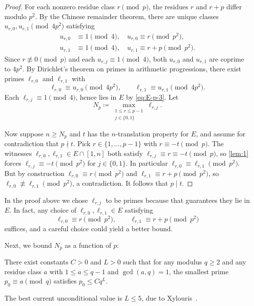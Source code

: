 \documentclass{amsart}
\begin{document}
\begin{proof}
    For each nonzero residue class $r \pmod p$, the residues $r$ and $r + p$ differ modulo $p^2$. By the Chinese remainder theorem, there are unique classes $u_{r,0}, u_{r,1} \pmod{4p^2}$ satisfying
\begin{align*}
u_{r,0}&\equiv 1\pmod 4,\quad u_{r,0}\equiv r\pmod{p^2},\\
u_{r,1}&\equiv 1\pmod 4,\quad u_{r,1}\equiv r+p\pmod{p^2}.
\end{align*}
    Since $r \not\equiv 0 \pmod p$ and each $u_{r,j} \equiv 1 \pmod 4$, both $u_{r,0}$ and $u_{r,1}$ are coprime to $4p^2$.
    By Dirichlet's theorem on primes in arithmetic progressions,
    there exist primes $\ell_{r,0}$ and $\ell_{r,1}$ with
\[
\ell_{r,0}\equiv u_{r,0}\pmod{4p^2}, \qquad \ell_{r,1}\equiv u_{r,1}\pmod{4p^2}.
\]
Each $\ell_{r,j} \equiv 1 \pmod 4$, hence lies in $E$ by \eqref{eq:E-p-3}. Let
\begin{equation*}
    N_p \coloneqq \max_{\substack{1 \leq r \leq p-1 \\ j \in \{0,1\}}} \ell_{r,j}.
\end{equation*}

Now suppose $n \geq N_p$ and $t$ has the $n$-translation property for $E$, and assume for contradiction that $p \nmid t$. Pick $r \in \{1, \dots, p-1\}$ with $r \equiv -t \pmod p$. The witnesses $\ell_{r,0}, \ell_{r,1} \in E \cap [1,n]$ both satisfy $\ell_{r,j} \equiv r \equiv -t \pmod p$, so \cref{lem:1} forces $\ell_{r,j} \equiv -t \pmod{p^2}$ for $j \in \{0,1\}$. In particular $\ell_{r,0} \equiv \ell_{r,1} \pmod{p^2}$. But by construction $\ell_{r,0} \equiv r \pmod{p^2}$ and $\ell_{r,1} \equiv r + p \pmod{p^2}$, so $\ell_{r,0} \not\equiv \ell_{r,1} \pmod{p^2}$, a contradiction. It follows that $p \mid t$.
\end{proof}

\begin{remark}
    In the proof above we chose $\ell_{r,j}$ to be primes because that guarantees they lie in $E$. In fact, any choice of $\ell_{r,0}, \ell_{r,1} \in E$ satisfying
    \begin{equation*}
        \ell_{r,0} \equiv r \pmod{p^2}, \qquad \ell_{r,1} \equiv r + p \pmod{p^2}
    \end{equation*}
    suffices, and a careful choice could yield a better bound.
\end{remark}

Next, we bound $N_p$ as a function of $p$:
\begin{theorem}\label{thm:A}
   There exist constants $C > 0$ and $L > 0$ such that for any modulus $q \geq 2$ and any residue class $a$ with $1 \leq a \leq q-1$ and $\gcd(a,q) = 1$, the smallest prime $p_0 \equiv a \pmod q$ satisfies $p_0 \leq C q^L$.
\end{theorem}
The best current unconditional value is $L \leq 5$, due to Xylouris~\cite{xylouris2011}.
\end{document}
